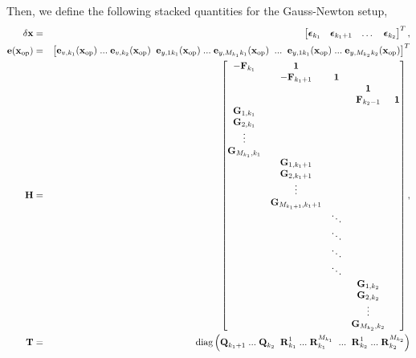 \documentclass[a4paper]{article}
\begin{document}
Then, we define the following stacked quantities for the Gauss-Newton setup,
\begin{eqnarray}
    \delta \bm{\mathbf{x}} &=& \begin{bmatrix}
      \bm{\mathbf{\epsilon}}_{k_1} & \bm{\mathbf{\epsilon}}_{k_1+1} & \dots & \bm{\mathbf{\epsilon}}_{k_2} 
    \end{bmatrix}^T, \\
    \bm{\mathbf{e}}(\bm{\mathbf{x}}_{\text{op}}) &=& \begin{bmatrix}
      \bm{\mathbf{e}}_{v,k_1}(\bm{\mathbf{x}}_{\text{op}})\; ...\;\bm{\mathbf{e}}_{v, k_2}(\bm{\mathbf{x}}_{\text{op}}) \;\;
      \bm{\mathbf{e}}_{y,1 k_1}(\bm{\mathbf{x}}_{\text{op}})\;...\;\bm{\mathbf{e}}_{y,M_{k_1} k_1}(\bm{\mathbf{x}}_{\text{op}}) \;\; ... \;\; \bm{\mathbf{e}}_{y,1 k_1}(\bm{\mathbf{x}}_{\text{op}})\;...\;\bm{\mathbf{e}}_{y,M_{k_2} k_2}(\bm{\mathbf{x}}_{\text{op}})
    \end{bmatrix}^T\\
    \bm{\mathbf{H}} &=& \begin{bmatrix}
      -\bm{\mathbf{F}}_{k_1} & \bm{\mathbf{1}}          & &&\\
                     & -\bm{\mathbf{F}}_{k_1+1} & \bm{\mathbf{1}} \\
      &&& \bm{\mathbf{1}} & \\
      &&& \bm{\mathbf{F}}_{k_2-1} & \bm{\mathbf{1}}\\
      \bm{\mathbf{G}}_{1,k_1}\\
      \bm{\mathbf{G}}_{2,k_1}\\
      \vdots\\
      \bm{\mathbf{G}}_{M_{k_1},k_1}\\
      &\bm{\mathbf{G}}_{1,k_1+1}\\
      &\bm{\mathbf{G}}_{2,k_1+1}\\
      &\vdots\\
      &\bm{\mathbf{G}}_{M_{k_1+1},k_1+1}\\
      &&\ddots\\
      &&\ddots\\
      &&\ddots\\
      &&\ddots\\
      &&&\bm{\mathbf{G}}_{1,k_2}\\
      &&&\bm{\mathbf{G}}_{2,k_2}\\
      &&&\vdots\\
      &&&\bm{\mathbf{G}}_{M_{k_2},k_2}
    \end{bmatrix},\\
    \bm{\mathbf{T}} &=& \text{diag} \left(
      \bm{\mathbf{Q}}_{k_1+1}\; ...\; \bm{\mathbf{Q}}_{k_2} \;\; {\bm{\mathbf{R}}_{k_1}^{1}}\;...\;{\bm{\mathbf{R}}_{k_1}^{M_{k_1}}}\;\;...\;\;{\bm{\mathbf{R}}_{k_2}^{1}}\;...\;{\bm{\mathbf{R}}_{k_2}^{M_{k_2}}} \right)
\end{eqnarray}
\end{document}
